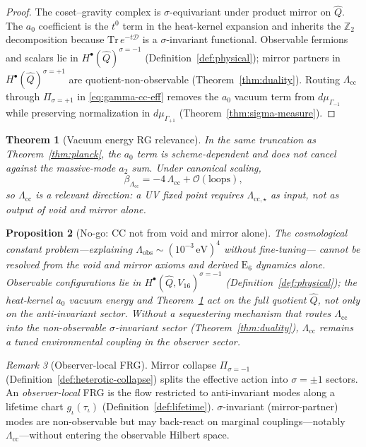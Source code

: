 \documentclass[11pt]{article}
\theoremstyle{plain}
\newtheorem{theorem}{Theorem}[section]
\newtheorem{proposition}[theorem]{Proposition}
\theoremstyle{definition}
\theoremstyle{remark}
\newtheorem{remark}[theorem]{Remark}
\numberwithin{equation}{section}
\newcommand{\E}[1]{\mathrm{E}_{#1}}
\begin{document}
\begin{proof}
The coset--gravity complex is $\sigma$-equivariant under product mirror on
$\hat Q$. The $a_0$ coefficient is the $t^0$ term in the heat-kernel
expansion and inherits the $\mathbb{Z}_2$ decomposition because
$\mathrm{Tr}\,e^{-t\mathcal{D}}$ is a $\sigma$-invariant functional.
Observable fermions and scalars lie in $H^\bullet(\hat Q)^{\sigma=-1}$
(Definition~\ref{def:physical}); mirror partners in
$H^\bullet(\hat Q)^{\sigma=+1}$ are quotient-non-observable
(Theorem~\ref{thm:duality}). Routing $\Lambda_{\mathrm{cc}}$ through
$\Pi_{\sigma=+1}$ in \eqref{eq:gamma-cc-eff} removes the $a_0$ vacuum term
from $d\mu_{\Gamma_{-1}}$ while preserving normalization in
$d\mu_{\Gamma_{+1}}$ (Theorem~\ref{thm:sigma-measure}).
\end{proof}

\begin{theorem}[Vacuum energy RG relevance]\label{thm:cc-rg}
In the same truncation as Theorem~\ref{thm:planck}, the $a_0$ term is
scheme-dependent and does not cancel against the massive-mode $a_2$ sum. Under
canonical scaling,
\begin{equation}\label{eq:beta-Lambda}
  \beta_{\Lambda_{\mathrm{cc}}}
  =-4\,\Lambda_{\mathrm{cc}}+\mathcal{O}(\text{loops}),
\end{equation}
so $\Lambda_{\mathrm{cc}}$ is a \emph{relevant} direction: a UV fixed point
requires $\Lambda_{\mathrm{cc},\star}$ as input, not as output of void and
mirror alone.
\end{theorem}

\begin{proposition}[No-go: CC not from void and mirror alone]
\label{prop:cc-nogo}
The cosmological constant problem---explaining
$\Lambda_{\mathrm{obs}}\sim(10^{-3}\,\mathrm{eV})^4$ without fine-tuning---
cannot be resolved from the void and mirror axioms and derived $\E{6}$
dynamics \emph{alone}. Observable configurations lie in
$H^\bullet(\hat Q,V_{16})^{\sigma=-1}$ (Definition~\ref{def:physical}); the
heat-kernel $a_0$ vacuum energy and Theorem~\ref{thm:cc-rg} act on the full
quotient $\hat Q$, not only on the anti-invariant sector. Without a
sequestering mechanism that routes $\Lambda_{\mathrm{cc}}$ into the
non-observable $\sigma$-invariant sector (Theorem~\ref{thm:duality}),
$\Lambda_{\mathrm{cc}}$ remains a tuned environmental coupling in the
observer sector.
\end{proposition}

\begin{remark}[Observer-local FRG]\label{rmk:observer-frg}
Mirror collapse $\Pi_{\sigma=-1}$ (Definition~\ref{def:heterotic-collapse})
splits the effective action into $\sigma=\pm1$ sectors. An \emph{observer-local}
FRG is the flow restricted to anti-invariant modes along a lifetime chart
$g_\iota(\tau_\iota)$ (Definition~\ref{def:lifetime}). $\sigma$-invariant
(mirror-partner) modes are non-observable but may back-react on marginal
couplings---notably $\Lambda_{\mathrm{cc}}$---without entering the observable
Hilbert space.
\end{remark}
\end{document}
